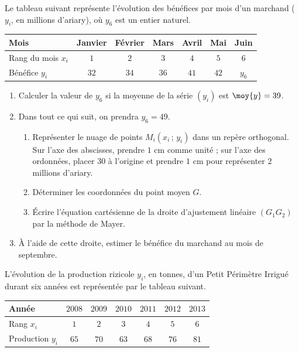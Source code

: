 \begin{annales}
Le tableau suivant représente l'évolution des bénéfices par mois d'un
marchand ($y_{i}$, en millions d'ariary), où $y_{6}$ est un entier naturel.

\begin{center}\footnotesize
\renewcommand{\arraystretch}{1.25}
\begin{tabular}{|l|c|c|c|c|c|c|}
\hline
Mois & Janvier & Février & Mars & Avril & Mai & Juin\\
\hline
Rang du mois $x_{i}$ & $1$ & $2$ & $3$ & $4$ & $5$ & $6$\\
\hline
Bénéfice $y_{i}$ & $32$ & $34$ & $36$ & $41$ & $42$ & $y_{6}$\\
\hline
\end{tabular}
\end{center}

\begin{enumerate}[label=\textbf{\arabic*)}, leftmargin=*, itemsep=0.15em]
  \item Calculer la valeur de $y_{6}$ si la moyenne de la série $(y_{i})$
        est $\moy{y} = 39$.
  \item Dans tout ce qui suit, on prendra $y_{6} = 49$.
        \begin{enumerate}[label=\textbf{\alph*)}, leftmargin=1.4em]
          \item Représenter le nuage de points $M_{i}(x_{i}\,;\,y_{i})$ dans
                un repère orthogonal. Sur l'axe des abscisses, prendre
                $1$ cm comme unité ; sur l'axe des ordonnées, placer $30$ à
                l'origine et prendre $1$ cm pour représenter $2$ millions
                d'ariary.
          \item Déterminer les coordonnées du point moyen $G$.
          \item Écrire l'équation cartésienne de la droite d'ajustement
                linéaire $\left(G_{1}G_{2}\right)$ par la méthode de Mayer.
        \end{enumerate}
  \item À l'aide de cette droite, estimer le bénéfice du marchand au mois de
        septembre.
\end{enumerate}

L'évolution de la production rizicole $y_{i}$, en tonnes, d'un Petit
Périmètre Irrigué durant six années est représentée par le tableau suivant.

\begin{center}\footnotesize
\renewcommand{\arraystretch}{1.25}
\begin{tabular}{|l|c|c|c|c|c|c|}
\hline
Année & $2008$ & $2009$ & $2010$ & $2011$ & $2012$ & $2013$\\
\hline
Rang $x_{i}$ & $1$ & $2$ & $3$ & $4$ & $5$ & $6$\\
\hline
Production $y_{i}$ & $65$ & $70$ & $63$ & $68$ & $76$ & $81$\\
\hline
\end{tabular}
\end{center}


\end{annales}
